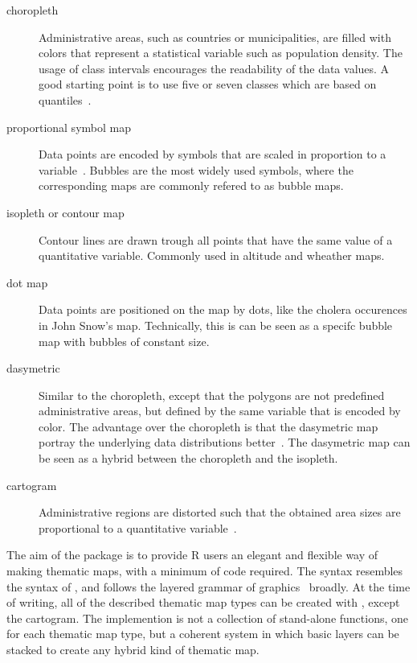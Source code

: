 \begin{description}
\item[choropleth] Administrative areas, such as countries or municipalities, are filled with colors that represent a statistical variable such as population density. The usage of class intervals encourages the readability of the data values. A good starting point is to use five or seven classes which are based on quantiles~\citep{brewer02}.
\item[proportional symbol map] Data points are encoded by symbols that are scaled in proportion to a variable~\citep{slocum09}. Bubbles are the most widely used symbols, where the corresponding maps are commonly refered to as bubble maps.%
\item[isopleth or contour map] Contour lines are drawn trough all points that have the same value of a quantitative variable. Commonly used in altitude and wheather maps.
\item[dot map] Data points are positioned on the map by dots, like the cholera occurences in John Snow's map. Technically, this is can be seen as a specifc bubble map with bubbles of constant size.
\item[dasymetric] Similar to the choropleth, except that the polygons are not predefined administrative areas, but defined by the same variable that is encoded by color. The advantage over the choropleth is that the dasymetric map portray the underlying data distributions better~\citep{langford94}. The dasymetric map can be seen as a hybrid between the choropleth and the isopleth.%
\item[cartogram] Administrative regions are distorted such that the obtained area sizes are proportional to a quantitative variable~\citep{gastner2004}.
\end{description}


The aim of the  package is to provide R users an elegant and flexible way of making thematic maps, with a minimum of code required. The syntax resembles the syntax of , and follows the layered grammar of graphics~\citep{wickham10} broadly. At the time of writing, all of the described thematic map types can be created with , except the cartogram. The implemention is not a collection of stand-alone functions, one for each thematic map type, but a coherent system in which basic layers can be stacked to create any hybrid kind of thematic map.




